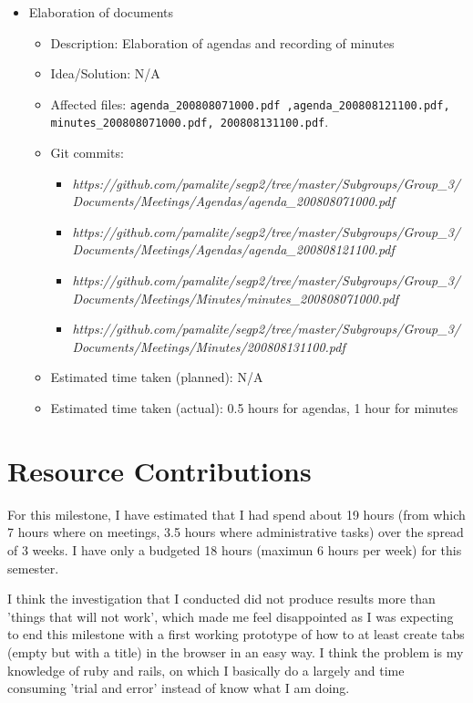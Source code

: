 \documentclass{article}
\begin{document}
\begin{itemize}
\begin{itemize}
	     \end{itemize}
	\item Elaboration of documents
	     \begin{itemize}
	         \item Description: Elaboration of agendas and recording of minutes 
	         \item Idea/Solution: N/A
	         \item Affected files: \texttt{agenda_200808071000.pdf ,agenda_200808121100.pdf, minutes_200808071000.pdf, 200808131100.pdf}.  
	         \item Git commits: \begin{itemize}
	                             \item \textit{https://github.com/pamalite/segp2/tree/master/Subgroups/Group_3/Documents/Meetings/Agendas/agenda_200808071000.pdf}
				     \item \textit{https://github.com/pamalite/segp2/tree/master/Subgroups/Group_3/Documents/Meetings/Agendas/agenda_200808121100.pdf}
				     \item \textit{https://github.com/pamalite/segp2/tree/master/Subgroups/Group_3/Documents/Meetings/Minutes/minutes_200808071000.pdf}
				     \item \textit{https://github.com/pamalite/segp2/tree/master/Subgroups/Group_3/Documents/Meetings/Minutes/200808131100.pdf} 
	                            \end{itemize}
		 \item Estimated time taken (planned): N/A
	         \item Estimated time taken (actual): 0.5 hours for agendas, 1 hour for minutes
	     \end{itemize}
\end{itemize}

\section*{Resource Contributions}

For this milestone, I have estimated that I had spend about 19 hours (from which 7 hours where on meetings, 3.5 hours where administrative tasks) over the spread of 3 weeks. I have only a budgeted 18 hours (maximun 6 hours per week) for this semester. 

I think the investigation that I conducted did not produce results more than 'things that will not work', which made me feel disappointed as I was expecting to end this milestone with a first working prototype of how to at least create tabs (empty but with a title) in the browser in an easy way.  I think the problem is my knowledge of ruby and rails, on which I basically do a largely and time consuming 'trial and error' instead of know what I am doing.
\end{document}
